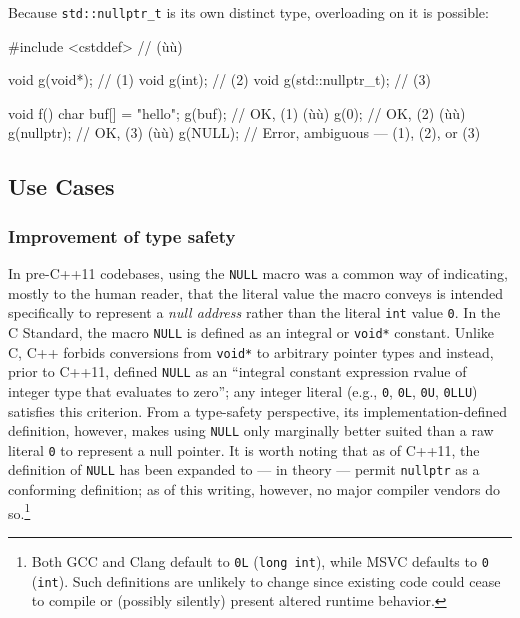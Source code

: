 \noindent Because \lstinline!std::nullptr_t! is its own distinct type, overloading on
it is possible:

\begin{emcppslisting}
#include <cstddef>  // (ù{}ù)

void g(void*);           // (1)
void g(int);             // (2)
void g(std::nullptr_t);  // (3)

void f()
{
    char buf[] = "hello";
    g(buf);      // OK, (1) (ù{}ù)
    g(0);        // OK, (2) (ù{}ù)
    g(nullptr);  // OK, (3) (ù{}ù)
    g(NULL);     // Error, ambiguous --- (1), (2), or (3)
}
\end{emcppslisting}


\subsection[Use Cases]{Use Cases}\label{use-cases}

\subsubsection[Improvement of type safety]{Improvement of type safety}\label{improve-type-safety}

In pre-C++11 codebases, using the \lstinline!NULL!
macro was a common way of indicating, mostly to the human
reader, that the literal value the macro conveys is intended specifically to
represent a \emph{null address} rather than the literal \lstinline!int!
value \lstinline!0!. In the C Standard, the macro \lstinline!NULL! is
defined as an  integral or \lstinline!void*!
constant. Unlike C, C++ forbids conversions from \lstinline!void*! to
arbitrary pointer types and instead, prior to C++11, defined
\lstinline!NULL! as an ``integral constant expression rvalue of
integer type that evaluates to zero''; any integer literal (e.g.,
\lstinline!0!, \lstinline!0L!, \lstinline!0U!, \lstinline!0LLU!) satisfies this
  criterion. From a type-safety perspective, its
implementation-defined definition, however,
makes using \lstinline!NULL! only marginally better suited than a raw
literal \lstinline!0! to represent a null pointer. It is worth noting that as of C++11, the definition of \lstinline!NULL! has been expanded to --- in theory --- permit \lstinline!nullptr! as a conforming definition; as of this writing, however, no major compiler vendors do so.{\cprotect\footnote{Both GCC and
Clang default to \lstinline!0L! (\lstinline!long!~\lstinline!int!), while MSVC
defaults to \lstinline!0! (\lstinline!int!). Such definitions are unlikely
to change since existing code could cease to compile or (possibly
  silently) present altered runtime behavior.}}


